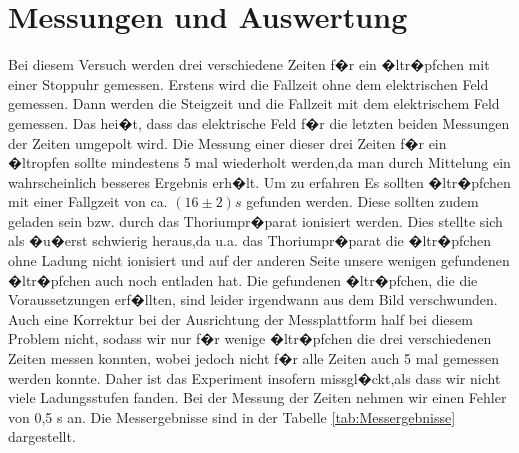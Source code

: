 \documentclass{scrartcl}
\begin{document}
\section{Messungen und Auswertung}
Bei diesem Versuch werden drei verschiedene Zeiten f�r ein �ltr�pfchen mit einer Stoppuhr gemessen. Erstens wird die Fallzeit ohne dem elektrischen Feld gemessen. Dann werden die Steigzeit und die Fallzeit mit dem elektrischem Feld gemessen. Das hei�t, dass das elektrische Feld f�r die letzten beiden Messungen der Zeiten umgepolt wird. Die Messung einer dieser drei Zeiten f�r ein �ltropfen sollte mindestens 5 mal wiederholt werden,da man durch Mittelung ein wahrscheinlich besseres Ergebnis erh�lt. Um zu erfahren
Es sollten �ltr�pfchen mit einer Fallgzeit von ca. $(16\pm2){s}$ gefunden werden. Diese sollten zudem geladen sein bzw. durch das Thoriumpr�parat ionisiert werden. Dies stellte sich als �u�erst schwierig heraus,da u.a. das Thoriumpr�parat die �ltr�pfchen ohne Ladung nicht ionisiert und auf der anderen Seite unsere wenigen gefundenen �ltr�pfchen auch noch entladen hat. Die gefundenen �ltr�pfchen, die die Voraussetzungen erf�llten, sind leider irgendwann aus dem Bild verschwunden. Auch eine Korrektur bei der Ausrichtung der Messplattform half bei diesem Problem nicht, sodass wir nur f�r wenige �ltr�pfchen die drei verschiedenen Zeiten messen konnten, wobei jedoch nicht f�r alle Zeiten auch 5 mal gemessen werden konnte. Daher ist das Experiment insofern missgl�ckt,als dass wir nicht viele Ladungsstufen fanden. Bei der Messung der Zeiten nehmen wir einen Fehler von 0,5 s an. Die Messergebnisse sind in der Tabelle \ref{tab:Messergebnisse} dargestellt.
\vspace{\baselineskip}
\end{document}
